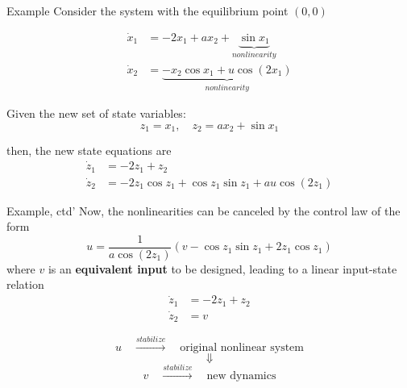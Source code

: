 \documentclass{beamer}
\begin{document}
  \begin{frame}{Example}
  Consider the system with the equilibrium point $(0, 0)$

  \begin{equation}\label{input-state-example}
  \begin{aligned}
    \dot{x}_{1} &= -2x_{1}+ax_{2}+\underbrace{\sin x_{1}}_{nonlinearity} \\
    \dot{x}_{2} &= \underbrace{-x_{2}\cos x_{1} + u \cos(2x_{1})}_{nonlinearity}
  \end{aligned}
  \end{equation}

  Given the new set of state variables:
  $$ z_{1}=x_{1} , \quad z_{2}=ax_{2} + \sin x_{1} $$

  then, the new state equations are
    \begin{equation}\label{new-state}
      \begin{aligned}
        \dot{z}_{1} &= -2 z_{1}+z_{2} \\
        \dot{z}_{2} &= -2 z_{1} \cos z_{1}+\cos z_{1} \sin z_{1}+a u \cos \left(2 z_{1}\right)
      \end{aligned}
    \end{equation}
  \end{frame}


  \begin{frame}{Example, ctd'}
  Now, the nonlinearities can be canceled by the control law of the form
  $$
    u=\frac{1}{a \cos \left(2 z_{1}\right)}\left(v-\cos z_{1} \sin z_{1}+2 z_{1} \cos z_{1}\right)
  $$
  where $v$ is an \textbf{equivalent input} to be designed, leading to a linear input-state relation
  \begin{equation}\label{input-state-relation}
    \begin{aligned}
      \dot{z}_{1} &= -2z_{1} + z_{2} \\
      \dot{z}_{2} &= v
    \end{aligned}
  \end{equation}

  $$ u \quad \xrightarrow{stabilize} \quad \text{original nonlinear system}$$
  $$\Downarrow$$
  $$v \quad \xrightarrow{stabilize} \quad \text{new dynamics}$$
  \end{frame}
\end{document}
